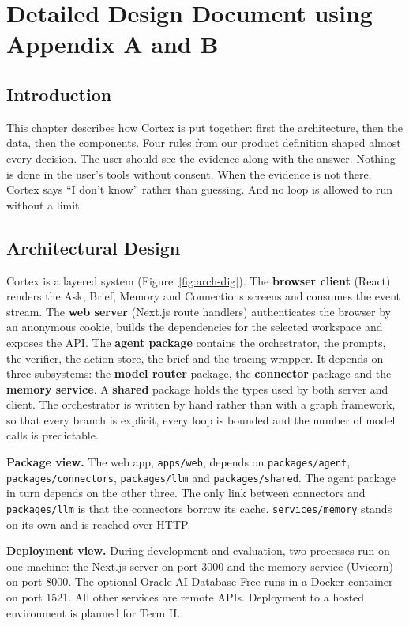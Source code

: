 \documentclass[oneside,a4paper,12pt]{report}
\begin{document}
\chapter{Detailed Design Document using Appendix A and B}
\label{ch:design}
 \section{Introduction}
This chapter describes how Cortex is put together: first the architecture, then the data, then the components. Four rules from our product definition shaped almost every decision. The user should see the evidence along with the answer. Nothing is done in the user's tools without consent. When the evidence is not there, Cortex says ``I don't know'' rather than guessing. And no loop is allowed to run without a limit.
\section{Architectural Design}
	Cortex is a layered system (Figure~\ref{fig:arch-dig}). The \textbf{browser client} (React) renders the Ask, Brief, Memory and Connections screens and consumes the event stream. The \textbf{web server} (Next.js route handlers) authenticates the browser by an anonymous cookie, builds the dependencies for the selected workspace and exposes the API. The \textbf{agent package} contains the orchestrator, the prompts, the verifier, the action store, the brief and the tracing wrapper. It depends on three subsystems: the \textbf{model router} package, the \textbf{connector} package and the \textbf{memory service}. A \textbf{shared} package holds the types used by both server and client. The orchestrator is written by hand rather than with a graph framework, so that every branch is explicit, every loop is bounded and the number of model calls is predictable.

\textbf{Package view.} The web app, \texttt{apps/\allowbreak{}web}, depends on \texttt{packages/\allowbreak{}agent}, \texttt{packages/\allowbreak{}connectors}, \texttt{packages/\allowbreak{}llm} and \texttt{packages/\allowbreak{}shared}. The agent package in turn depends on the other three. The only link between connectors and \texttt{packages/\allowbreak{}llm} is that the connectors borrow its cache. \texttt{services/\allowbreak{}memory} stands on its own and is reached over HTTP.

\textbf{Deployment view.} During development and evaluation, two processes run on one machine: the Next.js server on port 3000 and the memory service (Uvicorn) on port 8000. The optional Oracle AI Database Free runs in a Docker container on port 1521. All other services are remote APIs. Deployment to a hosted environment is planned for Term II.
\end{document}
